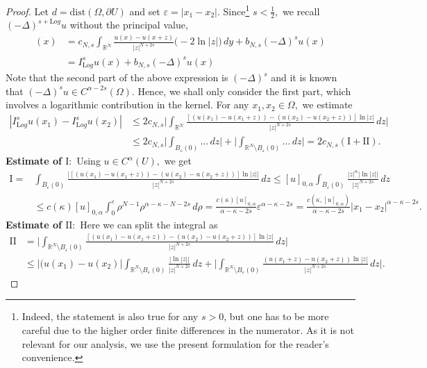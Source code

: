 \documentclass[10pt,a4paper]{amsart}
\newcommand{\RR}{\mathds{R}}
\begin{document}
\begin{proof}
 Let $d=\text{dist}(\Omega, \partial U)$ and set $\varepsilon = |x_1-x_2|.$ Since\footnote{Indeed, the statement is also true for any $s>0$, but one has to be more careful due to the higher order finite differences in the numerator. As it is not relevant for our analysis, we use the present formulation for the reader's convenience.} $s<\frac{1}{2}, $ we recall $(-\Delta)^{s+\mathrm Log}u$ without the principal value,
 \begin{align*}
  [(-\Delta)^{s+\mathrm Log}u](x)&= c_{N,s}\int_{\RR^N} \frac{u(x)-u(x+z)}{|z|^{N+2s}}\bigl(-2\ln|z|\bigr)\,dy+b_{N,s}(-\Delta)^s u(x)\\
  &=I^s_{\mathrm Log}u (x)+b_{N, s}(-\Delta)^s u(x)    
 \end{align*}
 Note that the second part of the above expression is $(-\Delta)^s$ and it is known that $(-\Delta)^su \in C^{\alpha-2s}(\Omega).$ Hence, we shall only consider the first part, which involves a logarithmic contribution in the kernel. For any $x_1, x_2 \in \Omega,$ we estimate
\begin{align*}
    |I^s_{\mathrm Log} u(x_1)-I^s_{\mathrm Log} u(x_2)|&\leq 2c_{N, s}\Bigg| \int_{\RR^N}\frac{\left[(u(x_1)-u(x_1+z))-(u(x_2)-u(x_2+z))\right]\ln |z|}{|z|^{N+2s}}\, dz\Bigg|\\
    &\leq 2c_{N, s}\Bigg|\int_{B_{\varepsilon}(0)}... \, dz\Bigg|+\Bigg|\int_{\RR^N\setminus B_{\varepsilon}(0)}...\, dz\Bigg|=2c_{N, s}(\mathrm I+\mathrm {II}).
\end{align*}
\textbf{Estimate of $\mathrm I:$ } Using $u \in C^{\alpha}(U),$ we get
\begin{align*}
    \mathrm I=&\int_{B_{\varepsilon}(0)}\frac{|[(u(x_1)-u(x_1+z))-(u(x_2)-u(x_2+z))]\ln |z||}{|z|^{N+2s}}\, dz\leq [u]_{0, \alpha}\int_{B_{\varepsilon}(0)}\frac{|z|^{\alpha}|\ln |z||}{|z|^{N+2s}}\, dz\\
    &\leq c(\kappa)[u]_{0, \alpha}\int_0^{\varepsilon}\rho^{N-1}\rho^{\alpha-\kappa-N-2s}\, d\rho= \frac{c(\kappa)[u]_{0, \alpha}}{\alpha-\kappa-2s} \varepsilon^{\alpha-\kappa -2s}=\frac{c(\kappa, [u]_{0, \alpha})}{\alpha-\kappa-2s}|x_1-x_2|^{\alpha-\kappa-2s}.
\end{align*}
\textbf{Estimate of $\mathrm {II}:$ } Here we can split the integral as
\begin{align*}
    \mathrm{II}&=\Bigg|\int_{\RR^N\setminus B_{\varepsilon}(0)}\frac{[(u(x_1)-u(x_1+z))-(u(x_2)-u(x_2+z))]\ln |z|}{|z|^{N+2s}}\, dz\Bigg|\\
    &\leq |(u(x_1)-u(x_2)|\int_{\RR^N\setminus B_{\varepsilon}(0)}\frac{|\ln |z||}{|z|^{N+2s}}\, dz+\Bigg|\int_{\RR^N\setminus B_{\varepsilon}(0)}\frac{(u(x_1+z)-u(x_2+z))\ln |z|}{|z|^{N+2s}}\, dz\Bigg|.

\end{align*}
\end{proof}
\end{document}
